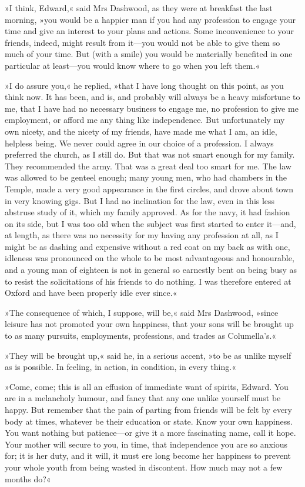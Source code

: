»I think, Edward,« said Mrs Dashwood, as they were at breakfast the last morning, »you would be a happier man if you had any profession to engage your time and give an interest to your plans and actions. Some inconvenience to your friends, indeed, might result from it—you would not be able to give them so much of your time. But (with a smile) you would be materially benefited in one particular at least—you would know where to go when you left them.«

»I do assure you,« he replied, »that I have long thought on this point, as you think now. It has been, and is, and probably will always be a heavy misfortune to me, that I have had no necessary business to engage me, no profession to give me employment, or afford me any thing like independence. But unfortunately my own nicety, and the nicety of my friends, have made me what I am, an idle, helpless being. We never could agree in our choice of a profession. I always preferred the church, as I still do. But that was not smart enough for my family. They recommended the army. That was a great deal too smart for me. The law was allowed to be genteel enough; many young men, who had chambers in the Temple, made a very good appearance in the first circles, and drove about town in very knowing gigs. But I had no inclination for the law, even in this less abstruse study of it, which my family approved. As for the navy, it had fashion on its side, but I was too old when the subject was first started to enter it—and, at length, as there was no necessity for my having any profession at all, as I might be as dashing and expensive without a red coat on my back as with one, idleness was pronounced on the whole to be most advantageous and honourable, and a young man of eighteen is not in general so earnestly bent on being busy as to resist the solicitations of his friends to do nothing. I was therefore entered at Oxford and have been properly idle ever since.«

»The consequence of which, I suppose, will be,« said Mrs Dashwood, »since leisure has not promoted your own happiness, that your sons will be brought up to as many pursuits, employments, professions, and trades as Columella’s.«

»They will be brought up,« said he, in a serious accent, »to be as unlike myself as is possible. In feeling, in action, in condition, in every thing.«

»Come, come; this is all an effusion of immediate want of spirits, Edward. You are in a melancholy humour, and fancy that any one unlike yourself must be happy. But remember that the pain of parting from friends will be felt by every body at times, whatever be their education or state. Know your own happiness. You want nothing but patience—or give it a more fascinating name, call it hope. Your mother will secure to you, in time, that independence you are so anxious for; it is her duty, and it will, it must ere long become her happiness to prevent your whole youth from being wasted in discontent. How much may not a few months do?«

